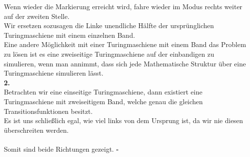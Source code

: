 \documentclass[12pt, a4paper]{article}
\newcommand*{\qed}{\null\nobreak\hfill\ensuremath{\square}}
\begin{document}
Wenn wieder die Markierung erreicht wird, fahre wieder im  Modus rechts weiter auf der zweiten Stelle. \\
Wir ersetzen sozusagen die Linke unendliche Hälfte der ursprünglichen Turingmaschiene mit einem einzelnen Band. \\
Eine andere Möglichkeit mit einer Turingmaschiene mit einem Band das Problem zu lösen ist es eine zweiseitige Turingmaschiene auf der einbandigen zu simulieren, wenn man annimmt, dass sich jede Mathematische Struktur über eine Turingmaschiene simulieren lässt.\\
\textbf{2. } \textquote{\(\Leftarrow\)} \\
Betrachten wir eine einseitige Turingmaschiene, dann existiert eine Turingmaschiene mit zweiseitigem Band, welche genau die gleichen Transitionsfunktionen besitzt. \\
Es ist uns schließlich egal, wie viel  links von dem Ursprung ist, da wir nie diesen überschreiten werden. \\
\\
Somit sind beide Richtungen gezeigt. \qed
\end{document}
